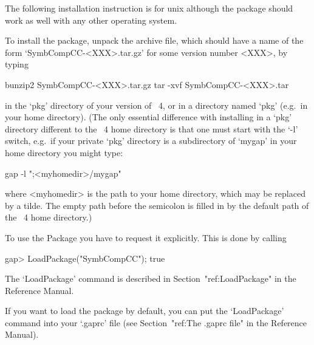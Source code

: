 


The following installation instruction is for unix although the package
should work as well with any other operating system.

To install the {\SymbCompCC} package, unpack the archive file, which  should
have a name of the form `SymbCompCC-<XXX>.tar.gz' for some version number 
<XXX>, by typing

bunzip2 SymbCompCC-<XXX>.tar.gz
tar -xvf SymbCompCC-<XXX>.tar

in the `pkg' directory of your version of {\GAP}~4,  or  in  a  directory
named `pkg' (e.g.~in your home directory). (The only essential difference
with installing {\SymbCompCC} in a `pkg' directory different to the {\GAP}~4
home directory is that one  must  start  {\GAP}  with  the  `-l'  switch,
e.g.~if your private `pkg' directory is a subdirectory of `mygap' in your
home directory you might type:

gap -l ";<myhomedir>/mygap"

where <myhomedir> is the  path  to  your  home  directory,  which
may be replaced  by  a  tilde.  The  empty  path  before  the
semicolon is  filled  in  by  the  default  path  of  the  {\GAP}~4  home
directory.)


To use the {\SymbCompCC} Package you have to request it explicitly. This  is
done by calling

\beginexample
gap> LoadPackage("SymbCompCC");
true
\endexample

The `LoadPackage' command is described  in  Section~"ref:LoadPackage"  in
the {\GAP} Reference Manual.

If you want to load the {\SymbCompCC} package by default, you  can  put  the
`LoadPackage' command  into  your  `.gaprc'  file  (see  Section~"ref:The
.gaprc file" in the {\GAP} Reference Manual).

